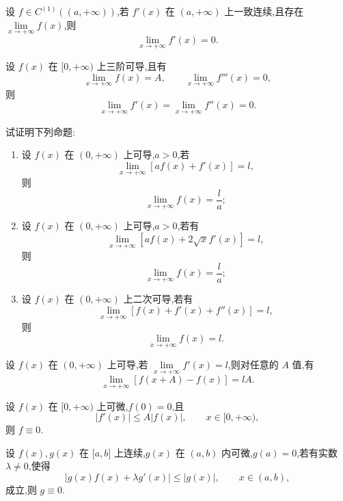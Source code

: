 \documentclass[../数学分析培优讲义.tex]{subfiles}
\begin{document}
\begin{example}[\markstar]
设 $f\in C^{(1)}((a,+\infty))$,若 $f'(x)$ 在 $(a,+\infty)$ 上一致连续,且存在 $\displaystyle\lim\limits_{x\to+\infty}f(x)$,则
\[
    \lim\limits_{x\to+\infty}f'(x)=0.
\]
\end{example}
\exampleblank

\begin{example}[\markstar]
设 $f(x)$ 在 $\lbrack 0,+\infty)$ 上三阶可导,且有
\[
    \lim\limits_{x\to+\infty}f(x)=A,
    \qquad
    \lim\limits_{x\to+\infty}f'''(x)=0,
\]
则
\[
    \lim\limits_{x\to+\infty}f'(x)
    =\lim\limits_{x\to+\infty}f''(x)=0.
\]
\end{example}
\exampleblank

\begin{example}[\markstar]
试证明下列命题:
\begin{enumerate}[label=(\arabic*)]
    \item 设 $f(x)$ 在 $(0,+\infty)$ 上可导,$a>0$,若
    \[
        \lim\limits_{x\to+\infty}[af(x)+f'(x)]=l,
    \]
    则
    \[
        \lim\limits_{x\to+\infty}f(x)=\dfrac{l}{a};
    \]
    \item 设 $f(x)$ 在 $(0,+\infty)$ 上可导,$a>0$,若有
    \[
        \lim\limits_{x\to+\infty}[af(x)+2\sqrt{x}f'(x)]=l,
    \]
    则
    \[
        \lim\limits_{x\to+\infty}f(x)=\dfrac{l}{a};
    \]
    \item 设 $f(x)$ 在 $(0,+\infty)$ 上二次可导,若有
    \[
        \lim\limits_{x\to+\infty}[f(x)+f'(x)+f''(x)]=l,
    \]
    则
    \[
        \lim\limits_{x\to+\infty}f(x)=l.
    \]
\end{enumerate}
\end{example}
\exampleblank

\begin{example}
设 $f(x)$ 在 $(0,+\infty)$ 上可导,若 $\displaystyle\lim\limits_{x\to+\infty}f'(x)=l$,则对任意的 $A$ 值,有
\[
    \lim\limits_{x\to+\infty}[f(x+A)-f(x)]=lA.
\]
\end{example}
\exampleblank

\begin{example}[\markstar]
设 $f(x)$ 在 $\lbrack 0,+\infty)$ 上可微,$f(0)=0$,且
\[
    |f'(x)|\leq A|f(x)|,
    \qquad x\in\lbrack 0,+\infty),
\]
则 $f\equiv0$.
\end{example}
\exampleblank

\begin{example}
设 $f(x),g(x)$ 在 $\lbrack a,b\rbrack$ 上连续,$g(x)$ 在 $(a,b)$ 内可微,$g(a)=0$,若有实数 $\lambda\neq0$,使得
\[
    |g(x)f(x)+\lambda g'(x)|\leq|g(x)|,
    \qquad x\in(a,b),
\]
成立,则 $g\equiv0$.
\end{example}
\exampleblank
\end{document}
